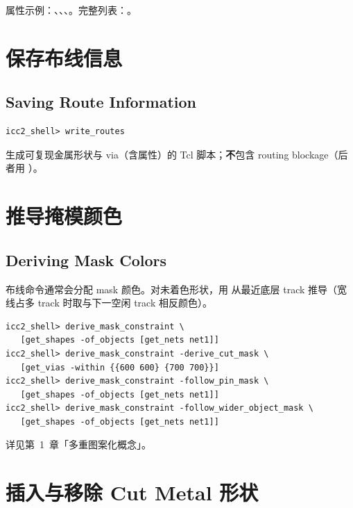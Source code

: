 属性示例：、、、。完整列表：。

\section{保存布线信息}
\subsection*{Saving Route Information}

\begin{lstlisting}
icc2_shell> write_routes
\end{lstlisting}

生成可复现金属形状与 via（含属性）的 Tcl 脚本；\textbf{不}包含 routing blockage（后者用 ）。

\section{推导掩模颜色}
\subsection*{Deriving Mask Colors}

布线命令通常会分配 mask 颜色。对未着色形状，用  从最近底层 track 推导（宽线占多 track 时取与下一空闲 track 相反颜色）。

\begin{lstlisting}
icc2_shell> derive_mask_constraint \
   [get_shapes -of_objects [get_nets net1]]
icc2_shell> derive_mask_constraint -derive_cut_mask \
   [get_vias -within {{600 600} {700 700}}]
icc2_shell> derive_mask_constraint -follow_pin_mask \
   [get_shapes -of_objects [get_nets net1]]
icc2_shell> derive_mask_constraint -follow_wider_object_mask \
   [get_shapes -of_objects [get_nets net1]]
\end{lstlisting}

\begin{seeAlsoBox}
详见第~1~章「多重图案化概念」。
\end{seeAlsoBox}

\section{插入与移除 Cut Metal 形状}
